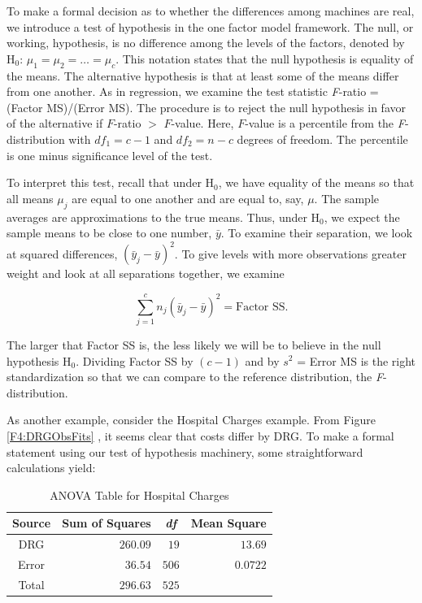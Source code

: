 To make a formal decision as to whether the differences among
machines are real, we introduce a test of hypothesis in the one
factor model framework. The null, or working, hypothesis, is no
difference among the levels of the factors, denoted by H$_0$: $\mu
_1=\mu_2=\ldots =\mu_c$. This notation states that the null
hypothesis is equality of the means. The alternative hypothesis is
that at least some of the means differ from one another. As in
regression, we examine the test statistic \textit{F}-ratio = (Factor
MS)/(Error MS). The procedure is to reject the null hypothesis in
favor of the alternative if $F$-ratio $>$ $F$-value. Here, $F$-value
is a percentile from the \textit{F}-distribution with $df_1=c-1$ and
$df_2=n-c$ degrees of freedom. The percentile is one minus
significance level of the test.

To interpret this test, recall that under H$_0$, we have equality of
the means so that all means $\mu_{j}$ are equal to one another and
are equal to, say, $\mu $. The sample averages are approximations to
the true means.
Thus, under H$_0$, we expect the sample means to be close to one number, $%
\bar{y}$. To examine their separation, we look at squared differences, $(%
\bar{y}_{j}-\bar{y})^{2}$. To give levels with more observations greater
weight and look at all separations together, we examine

\begin{equation*}
\sum_{j=1}^{c}n_{j}(\bar{y}_{j}-\bar{y})^{2}=\text{Factor SS}.
\end{equation*}

The larger that Factor SS is, the less likely we will be to believe
in the null hypothesis H$_0$. Dividing Factor SS by $(c-1)$ and by
$s^{2}$ = Error MS is the right standardization so that we can
compare to the reference distribution, the \textit{F}-distribution.


As another example, consider the Hospital Charges example. From
Figure \ref{F4:DRGObsFits} , it seems clear that costs differ by
DRG. To make a formal statement using our test of hypothesis
machinery, some straightforward calculations yield:

  \begin{center}  \begin{table}[h]
\caption{\label{T4:HospChgANOVA} ANOVA Table for Hospital Charges}
\begin{tabular}{cccc}
\hline
Source & Sum of Squares & \textit{df} & Mean Square \\ \hline
DRG & \multicolumn{1}{r}{$260.09$} & \multicolumn{1}{r}{$19$} &
\multicolumn{1}{r}{$13.69$} \\
Error & \multicolumn{1}{r}{$36.54$} & \multicolumn{1}{r}{$506$} &
\multicolumn{1}{r}{$0.0722$} \\
Total & \multicolumn{1}{r}{$296.63$} & \multicolumn{1}{r}{$525$} &
\multicolumn{1}{r}{} \\ \hline
\end{tabular}

\end{table}  \end{center}  

